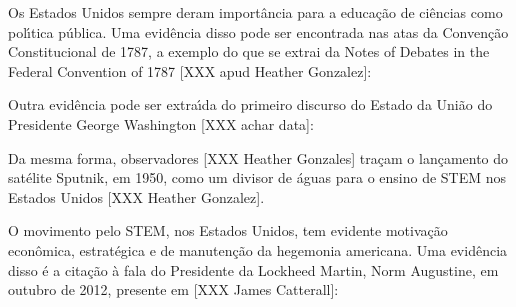 \documentclass[
12pt,		%
openright,	%
twoside,  %
a4paper,			%
chapter=TITLE,		%
english,			%
french,				%
spanish,			%
brazil				%
]{USPSC-classe/USPSC}
\begin{document}
Os Estados Unidos sempre deram import\^ancia para a educa\c{c}\~ao de ci\^encias como pol\'{\i}tica p\'ublica. Uma evid\^encia disso pode ser encontrada nas atas da Conven\c{c}\~ao Constitucional de 1787, a exemplo do que se extrai da \textquotedbl Notes of Debates in the Federal Convention of 1787 [XXX apud Heather Gonzalez]:










\noindent\begin{center}\mbox{\centering{}}\end{center}


Outra evid\^encia pode ser extra\'{\i}da do primeiro discurso do Estado da Uni\~ao do Presidente George Washington [XXX achar data]:










\noindent\begin{center}\mbox{\centering{}}\end{center}


Da mesma forma, observadores [XXX Heather Gonzales] tra\c{c}am o lan\c{c}amento do sat\'elite Sputnik, em 1950, como um divisor de \'aguas para o ensino de STEM nos Estados Unidos [XXX Heather Gonzalez].









O movimento pelo STEM, nos Estados Unidos, tem evidente motiva\c{c}\~ao econ\^omica, estrat\'egica e de manuten\c{c}\~ao da hegemonia americana. Uma evid\^encia disso \'e a cita\c{c}\~ao \`a fala do Presidente da Lockheed Martin, Norm Augustine, em outubro de 2012, presente em [XXX James Catterall]:
\end{document}
